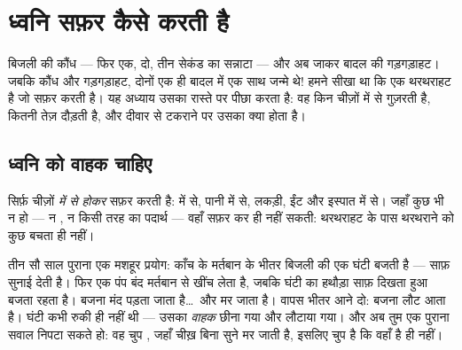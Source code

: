 \chapter{ध्वनि सफ़र कैसे करती है}\label{ch:g4:how-sound-travels}

बिजली की कौंध --- फिर एक, दो, तीन सेकंड का सन्नाटा --- और अब जाकर
बादल की गड़गड़ाहट। जबकि कौंध और गड़गड़ाहट, दोनों एक ही बादल में एक
साथ जन्मे थे! हमने सीखा था कि  एक थरथराहट है जो सफ़र करती है। यह
अध्याय उसका रास्ते पर पीछा करता है: वह किन चीज़ों में से गुज़रती है,
कितनी तेज़ दौड़ती है, और दीवार से टकराने पर उसका क्या होता है।

\section{ध्वनि को वाहक चाहिए}

\begin{proposition}[वाहक नहीं, तो ध्वनि नहीं]\label{prop:g4:how-sound-travels:carrier}
 सिर्फ़ चीज़ों \emph{में से होकर} सफ़र करती है:  में से, पानी
में से, लकड़ी, ईंट और इस्पात में से। जहाँ कुछ भी न हो --- न , न
किसी तरह का पदार्थ --- वहाँ  सफ़र कर ही नहीं सकती: थरथराहट के पास
थरथराने को कुछ बचता ही नहीं।
\end{proposition}

\begin{example}[मर्तबान में घंटी]\label{ex:g4:how-sound-travels:jar}
तीन सौ साल पुराना एक मशहूर प्रयोग: काँच के मर्तबान के भीतर बिजली की
एक घंटी बजती है --- साफ़ सुनाई देती है। फिर एक पंप बंद मर्तबान से 
खींच लेता है, जबकि घंटी का हथौड़ा साफ़ दिखता हुआ बजता रहता है। बजना
मंद पड़ता जाता है\dots\ और मर जाता है।  वापस भीतर आने दो: बजना
लौट आता है। घंटी कभी रुकी ही नहीं थी --- उसका \emph{वाहक} छीना गया
और लौटाया गया। और अब तुम एक पुराना सवाल निपटा सकते हो: वह चुप ,
जहाँ चीख़ बिना सुने मर जाती है, इसलिए चुप है कि वहाँ  है ही नहीं।
\end{example}

